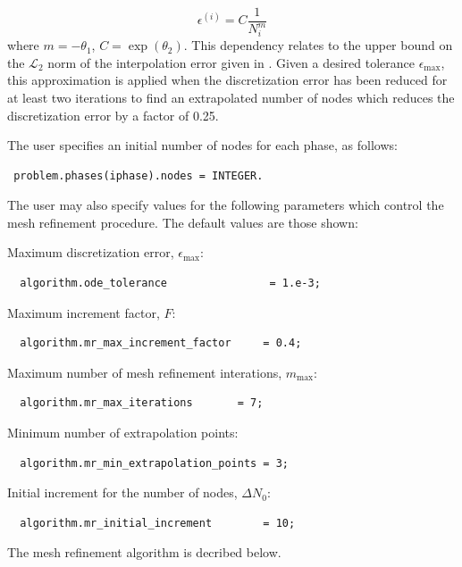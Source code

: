 \documentclass[a4paper,11pt]{report}    %
\begin{document}
\[
   \epsilon^{(i)}  = C \frac{1}{N_i^m}
\]
where $m=-\theta_1$, $C=\exp(\theta_2)$.  This dependency relates to the upper bound on the $\mathcal{L}_2$ norm of the 
interpolation error given in \cite{Canuto:06}. 
Given a desired tolerance $\epsilon_{\max}$, this approximation is applied when the discretization error has been reduced
for at least two iterations to find an extrapolated number of nodes which reduces the discretization error by a factor of 0.25.



The user specifies an initial number of nodes for each phase, as follows:
\begin{verbatim}
 problem.phases(iphase).nodes = INTEGER.
\end{verbatim}

The user may also specify values for the following parameters which control the mesh refinement
procedure. The default values are those shown:

\vspace{4mm}

\noindent Maximum discretization error, $\epsilon_{\max}$: 
\begin{verbatim}
  algorithm.ode_tolerance                = 1.e-3;
\end{verbatim}
Maximum increment factor, $F$:
\begin{verbatim}
  algorithm.mr_max_increment_factor     = 0.4;
\end{verbatim}
Maximum number of mesh refinement interations, $m_{\max}$:
\begin{verbatim}
  algorithm.mr_max_iterations		= 7;
\end{verbatim}
Minimum number of extrapolation points:
\begin{verbatim}
  algorithm.mr_min_extrapolation_points = 3;
\end{verbatim}
Initial increment for the number of nodes, $\Delta N_0$:
\begin{verbatim}
  algorithm.mr_initial_increment        = 10;
\end{verbatim}

The mesh refinement algorithm is decribed below.
\end{document}
